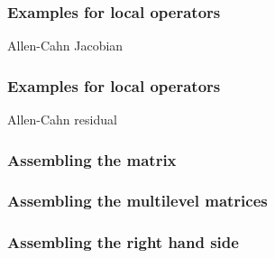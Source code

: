 \begin{frame}
  \frametitle{Examples for local operators}
  \begin{block}{Allen-Cahn Jacobian}
    
  \end{block}
\end{frame}

\begin{frame}
  \frametitle{Examples for local operators}
  \begin{block}{Allen-Cahn residual}
        
  \end{block}
\end{frame}

\begin{frame}[t]
  \frametitle{Assembling the matrix}
  
\end{frame}

\begin{frame}[t]
  \frametitle{Assembling the multilevel matrices}
  
\end{frame}

\begin{frame}[t]
  \frametitle{Assembling the right hand side}
  
\end{frame}

